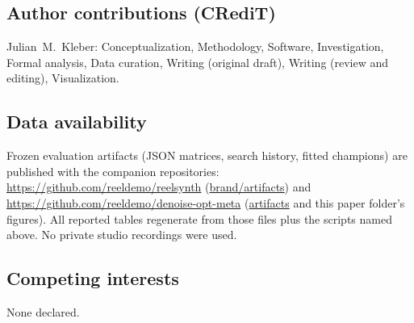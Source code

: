\subsection{Author contributions (CRediT)}
\label{sec:credit}
Julian~M.~Kleber: Conceptualization, Methodology, Software, Investigation, Formal analysis, Data curation, Writing (original draft), Writing (review and editing), Visualization.

\subsection{Data availability}
\label{sec:data-availability}
Frozen evaluation artifacts (JSON matrices, search history, fitted champions) are published with the companion repositories:
\url{https://github.com/reeldemo/reelsynth}
(\href{https://github.com/reeldemo/reelsynth/tree/main/brand/artifacts}{brand/artifacts})
and
\url{https://github.com/reeldemo/denoise-opt-meta}
(\href{https://github.com/reeldemo/denoise-opt-meta/tree/master/artifacts}{artifacts}
and this paper folder's figures).
All reported tables regenerate from those files plus the scripts named above.
No private studio recordings were used.

\subsection{Competing interests}
\label{sec:competing}
None declared.
